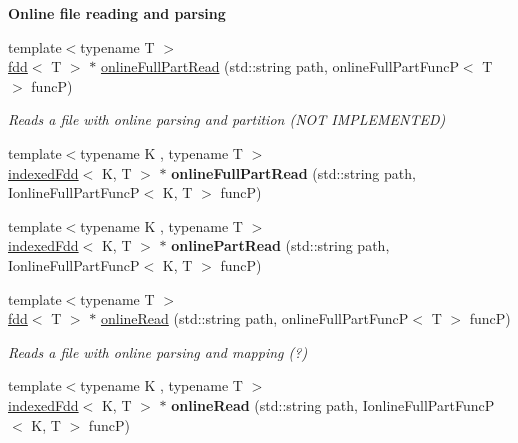 \begin{Indent}{\bf Online file reading and parsing}\par
\begin{DoxyCompactItemize}
\item 
{\footnotesize template$<$typename T $>$ }\\\hyperlink{classfaster_1_1fdd}{fdd}$<$ T $>$ $\ast$ \hyperlink{classfaster_1_1fastContext_acb65e4cdd0eaae3bf4326247b822e025}{online\+Full\+Part\+Read} (std\+::string path, online\+Full\+Part\+FuncP$<$ T $>$ funcP)
\begin{DoxyCompactList}\small\item\em Reads a file with online parsing and partition (N\+OT I\+M\+P\+L\+E\+M\+E\+N\+T\+ED) \end{DoxyCompactList}\item 
\hypertarget{classfaster_1_1fastContext_aead4c4e15303ae7af9fe78840f219c2a}{}\label{classfaster_1_1fastContext_aead4c4e15303ae7af9fe78840f219c2a} 
{\footnotesize template$<$typename K , typename T $>$ }\\\hyperlink{classfaster_1_1indexedFdd}{indexed\+Fdd}$<$ K, T $>$ $\ast$ {\bfseries online\+Full\+Part\+Read} (std\+::string path, Ionline\+Full\+Part\+FuncP$<$ K, T $>$ funcP)
\item 
\hypertarget{classfaster_1_1fastContext_a07f44b676114df50f159ae64225b07e4}{}\label{classfaster_1_1fastContext_a07f44b676114df50f159ae64225b07e4} 
{\footnotesize template$<$typename K , typename T $>$ }\\\hyperlink{classfaster_1_1indexedFdd}{indexed\+Fdd}$<$ K, T $>$ $\ast$ {\bfseries online\+Part\+Read} (std\+::string path, Ionline\+Full\+Part\+FuncP$<$ K, T $>$ funcP)
\item 
{\footnotesize template$<$typename T $>$ }\\\hyperlink{classfaster_1_1fdd}{fdd}$<$ T $>$ $\ast$ \hyperlink{classfaster_1_1fastContext_a8cf960425a7671021854367ea9649546}{online\+Read} (std\+::string path, online\+Full\+Part\+FuncP$<$ T $>$ funcP)
\begin{DoxyCompactList}\small\item\em Reads a file with online parsing and mapping (?) \end{DoxyCompactList}\item 
\hypertarget{classfaster_1_1fastContext_a1e099be70d2b7daeaf4a18f5f9542484}{}\label{classfaster_1_1fastContext_a1e099be70d2b7daeaf4a18f5f9542484} 
{\footnotesize template$<$typename K , typename T $>$ }\\\hyperlink{classfaster_1_1indexedFdd}{indexed\+Fdd}$<$ K, T $>$ $\ast$ {\bfseries online\+Read} (std\+::string path, Ionline\+Full\+Part\+FuncP$<$ K, T $>$ funcP)
\end{DoxyCompactItemize}
\end{Indent}

